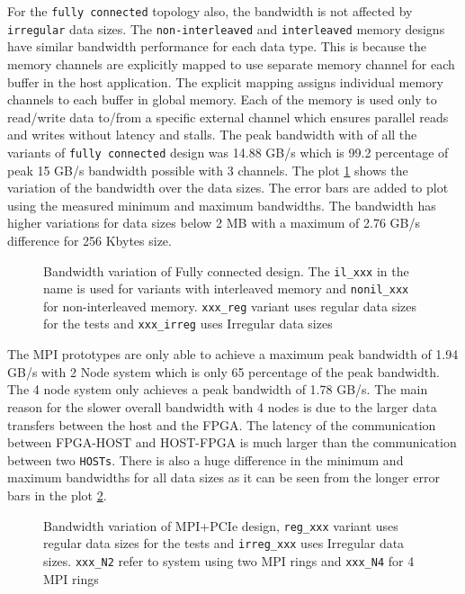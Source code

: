 For the \texttt{fully connected} topology also, the bandwidth is not affected by \texttt{irregular} data sizes.
The \texttt{non-interleaved} and \texttt{interleaved} memory designs have similar bandwidth performance for each data type.
This is because the memory channels are explicitly mapped to use separate memory channel for each buffer in the host application.
The explicit mapping assigns individual memory channels to each buffer in global memory. Each of the memory
is used only to read/write data to/from a specific external channel which ensures parallel reads
and writes without latency and stalls. The peak bandwidth with of all the variants of \texttt{fully connected}
design was 14.88 GB/s which is 99.2 percentage of peak 15 GB/s bandwidth possible with 3 channels.
The plot \ref{plot:fc} shows the variation of the bandwidth over the data sizes. The error bars are
added to plot using the measured minimum and maximum bandwidths. The bandwidth has higher variations
for data sizes below 2 MB with a maximum of 2.76 GB/s difference for 256 Kbytes size.

\begin{figure}[ht]
    \centering
    \scalebox{0.8}{}
    \caption{Bandwidth variation of Fully connected design.
    The \texttt{il_xxx} in the name
    is used for variants with interleaved memory and \texttt{nonil_xxx} for non-interleaved memory.
    \texttt{xxx_reg} variant uses regular data sizes for the tests and \texttt{xxx_irreg} uses Irregular data sizes}
    \label{plot:fc}
\end{figure}

The MPI prototypes are only able to achieve a maximum peak bandwidth of 1.94 GB/s with 2 Node system
which is only 65 percentage of the peak bandwidth. The 4 node system only achieves a peak bandwidth of
1.78 GB/s. The main reason for the slower overall bandwidth with 4 nodes is due to the larger
data transfers between the host and the FPGA. The latency of the communication between FPGA-HOST
and HOST-FPGA is much larger than the communication between two \texttt{HOSTs}. There is also a huge difference
in the minimum and maximum bandwidths for all data sizes as it can be seen from the longer error bars in the
plot \ref{plot:mpipcie}.

\begin{figure}[ht]
    \centering
    \scalebox{0.8}{}
    \caption{Bandwidth variation of MPI+PCIe design,
    \texttt{reg_xxx} variant uses regular data sizes for the tests and \texttt{irreg_xxx} uses Irregular data sizes.
    \texttt{xxx_N2} refer to system using two MPI rings and \texttt{xxx_N4} for 4 MPI rings}
    \label{plot:mpipcie}
\end{figure}

